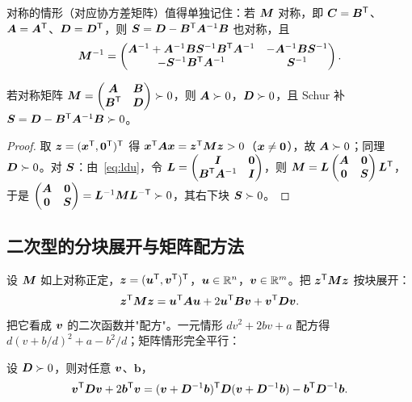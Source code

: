 对称的情形（对应协方差矩阵）值得单独记住：若 $\bm{M}$ 对称，即 $\bm{C}=\bm{B}^{\mathsf{T}}$、$\bm{A}=\bm{A}^{\mathsf{T}}$、$\bm{D}=\bm{D}^{\mathsf{T}}$，则 $\bm{S}=\bm{D}-\bm{B}^{\mathsf{T}}\bm{A}^{-1}\bm{B}$ 也对称，且
\[
\bm{M}^{-1}=
\begin{pmatrix}
\bm{A}^{-1}+\bm{A}^{-1}\bm{B}\bm{S}^{-1}\bm{B}^{\mathsf{T}}\bm{A}^{-1} & -\bm{A}^{-1}\bm{B}\bm{S}^{-1}\\
-\bm{S}^{-1}\bm{B}^{\mathsf{T}}\bm{A}^{-1} & \bm{S}^{-1}
\end{pmatrix}.
\]

\begin{proposition}\label{prop:schur-pd}
若对称矩阵 $\bm{M}=\begin{pmatrix}\bm{A}&\bm{B}\\ \bm{B}^{\mathsf{T}}&\bm{D}\end{pmatrix}\succ 0$，则 $\bm{A}\succ 0$，$\bm{D}\succ 0$，且 Schur 补 $\bm{S}=\bm{D}-\bm{B}^{\mathsf{T}}\bm{A}^{-1}\bm{B}\succ 0$。
\end{proposition}

\begin{proof}
取 $\bm{z}=(\bm{x}^{\mathsf{T}},\bm{0}^{\mathsf{T}})^{\mathsf{T}}$ 得 $\bm{x}^{\mathsf{T}}\bm{A}\bm{x}=\bm{z}^{\mathsf{T}}\bm{M}\bm{z}>0$（$\bm{x}\ne\bm{0}$），故 $\bm{A}\succ 0$；同理 $\bm{D}\succ 0$。对 $\bm{S}$：由~\eqref{eq:ldu}，令 $\bm{L}=\begin{pmatrix}\bm{I}&\bm{0}\\ \bm{B}^{\mathsf{T}}\bm{A}^{-1}&\bm{I}\end{pmatrix}$，则 $\bm{M}=\bm{L}\begin{pmatrix}\bm{A}&\bm{0}\\ \bm{0}&\bm{S}\end{pmatrix}\bm{L}^{\mathsf{T}}$，于是 $\begin{pmatrix}\bm{A}&\bm{0}\\ \bm{0}&\bm{S}\end{pmatrix}=\bm{L}^{-1}\bm{M}\bm{L}^{-\mathsf{T}}\succ 0$，其右下块 $\bm{S}\succ 0$。
\end{proof}

\subsection{二次型的分块展开与矩阵配方法}

设 $\bm{M}$ 如上对称正定，$\bm{z}=(\bm{u}^{\mathsf{T}},\bm{v}^{\mathsf{T}})^{\mathsf{T}}$，$\bm{u}\in\mathbb{R}^n$，$\bm{v}\in\mathbb{R}^m$。把 $\bm{z}^{\mathsf{T}}\bm{M}\bm{z}$ 按块展开：
\[
\bm{z}^{\mathsf{T}}\bm{M}\bm{z}=\bm{u}^{\mathsf{T}}\bm{A}\bm{u}+2\bm{u}^{\mathsf{T}}\bm{B}\bm{v}+\bm{v}^{\mathsf{T}}\bm{D}\bm{v} .
\]
把它看成 $\bm{v}$ 的二次函数并"配方"。一元情形 $dv^2+2bv+a$ 配方得 $d(v+b/d)^2+a-b^2/d$；矩阵情形完全平行：

\begin{lemma}[矩阵配方法]\label{lem:complete-square}
设 $\bm{D}\succ 0$，则对任意 $\bm{v}$、$\bm{b}$，
\[
\bm{v}^{\mathsf{T}}\bm{D}\bm{v}+2\bm{b}^{\mathsf{T}}\bm{v}=(\bm{v}+\bm{D}^{-1}\bm{b})^{\mathsf{T}}\bm{D}(\bm{v}+\bm{D}^{-1}\bm{b})-\bm{b}^{\mathsf{T}}\bm{D}^{-1}\bm{b}.
\]
\end{lemma}

